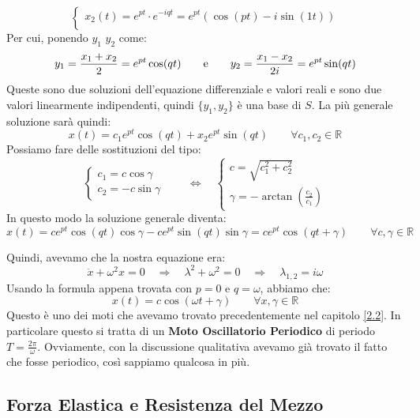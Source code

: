 \documentclass[11pt,a4paper,twoside]{article}
\theoremstyle{definition}
\begin{document}
\begin{itemize}
{\[\begin{cases}
			x_2(t) = e^{pt}\cdot e^{-iqt} = e^{pt}(\cos(pt) - i\sin(1t))\\
		\end{cases}\]
		Per cui, ponendo $y_1$ $y_2$ come:
		\[ y_1 = \frac{x_1 + x_2}2 = e^{pt}\cos(qt)\qquad \text e \qquad y_2 = \frac{x_1-x_2}{2i} = e^{pt}\sin(qt) \]
		Queste sono due soluzioni dell'equazione differenziale e valori reali e sono due valori linearmente indipendenti, quindi $\{y_1, y_2\}$ è una base di $S$. La più generale soluzione sarà quindi:
		\[ x(t) = c_1e^{pt}\cos(qt) + x_2e^{pt}\sin(qt)\qquad \forall c_1,c_2 \in \mathbb R \]
		Possiamo fare delle sostituzioni del tipo:
		\[\begin{cases}
			c_1 = c\cos \gamma\\
			c_2 = -c\sin \gamma
		\end{cases} \qquad \Leftrightarrow \quad \begin{cases}
			c = \sqrt{c_1^2 + c_2^2}\\
			\gamma = -\arctan (\frac{c_2}{c_1})
		\end{cases}\]
	In questo modo la soluzione generale diventa:}
	\[ x(t) = ce^{pt}\cos(qt) \cos\gamma - ce^{pt}\sin(qt)\sin \gamma = ce^{pt}\cos(qt + \gamma)\qquad \forall c, \gamma \in \mathbb R\]
\end{itemize}

Quindi, avevamo che la nostra equazione era:
\[ \ddot x + \omega^2 x = 0 \quad \Rightarrow \quad \lambda^2 + \omega^2 = 0\quad \Rightarrow\quad \lambda_{1,2} = i\omega \]
Usando la formula appena trovata con $p = 0$ e $q = \omega$, abbiamo che:
\[ x(t) = c\cos(\omega t + \gamma)\qquad \forall x,\gamma \in\mathbb R \]
Questo è uno dei moti che avevamo trovato precedentemente nel capitolo \ref{2.2}. In particolare questo si tratta di un \textbf{Moto Oscillatorio Periodico} di periodo $T = \frac{2\pi}\omega$. Ovviamente, con la discussione qualitativa avevamo già trovato il fatto che fosse periodico, così sappiamo qualcosa in più.

\subsection{Forza Elastica e Resistenza del Mezzo}
\end{document}
